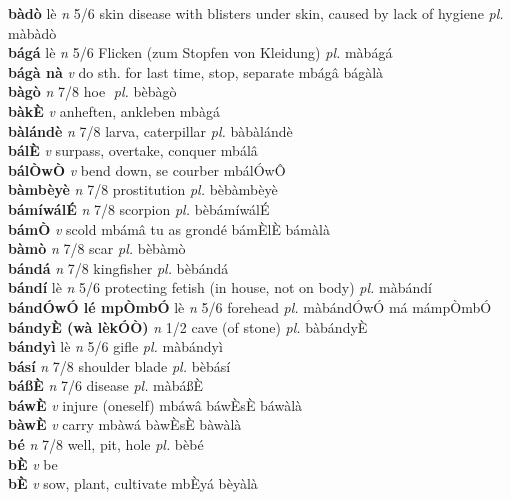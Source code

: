\documentclass{article}
\begin{document}
{\bf bàdò} lè {\it n} 5/6 skin disease with blisters under skin, caused by lack of hygiene {\it pl.} màbàdò         \\ 
{\bf bágá} lè {\it n} 5/6 Flicken (zum Stopfen von Kleidung) {\it pl.} màbágá         \\ 
{\bf bágà nà}  {\it v} do sth. for last time, stop, separate   mbágâ   bágàlà   \\ 
{\bf bàgò}  {\it n} 7/8 hoe {\it pl.} bèbàgò         \\ 
{\bf bàkÈ}  {\it v} anheften, ankleben   mbàgá      \\ 
{\bf bàlándè}  {\it n} 7/8 larva, caterpillar {\it pl.} bàbàlándè         \\ 
{\bf bálÈ}  {\it v} surpass, overtake, conquer   mbálâ      \\ 
{\bf bálÒwÒ}  {\it v} bend down, se courber   mbálÓwÔ      \\ 
{\bf bàmbèyè}  {\it n} 7/8 prostitution {\it pl.} bèbàmbèyè         \\ 
{\bf bámíwálÉ}  {\it n} 7/8 scorpion {\it pl.} bèbámíwálÉ         \\ 
{\bf bámÒ}  {\it v} scold   mbámâ tu as grondé bámÈlÈ  bámàlà   \\ 
{\bf bàmò}  {\it n} 7/8 scar {\it pl.} bèbàmò         \\ 
{\bf bándá}  {\it n} 7/8 kingfisher {\it pl.} bèbándá         \\ 
{\bf bándí} lè {\it n} 5/6 protecting fetish (in house, not on body) {\it pl.} màbándí         \\ 
{\bf bándÓwÓ lé mpÒmbÓ} lè {\it n} 5/6 forehead {\it pl.} màbándÓwÓ má mámpÒmbÓ         \\ 
{\bf bándyÈ (wà lèkÓÒ)}  {\it n} 1/2 cave (of stone) {\it pl.} bàbándyÈ         \\ 
{\bf bándyì} lè {\it n} 5/6 gifle {\it pl.} màbándyì         \\ 
{\bf básí}  {\it n} 7/8 shoulder blade {\it pl.} bèbásí         \\ 
{\bf báßÈ}  {\it n} 7/6 disease {\it pl.} màbáßÈ         \\ 
{\bf báwÈ}  {\it v} injure (oneself)   mbáwâ  báwÈsÈ báwàlà   \\ 
{\bf bàwÈ}  {\it v} carry   mbàwá  bàwÈsÈ bàwàlà   \\ 
{\bf bé}  {\it n} 7/8 well, pit, hole {\it pl.} bèbé         \\ 
{\bf bÈ}  {\it v} be         \\ 
{\bf bÈ}  {\it v} sow, plant, cultivate   mbÈyá   bèyàlà   \\ 
\end{document}
